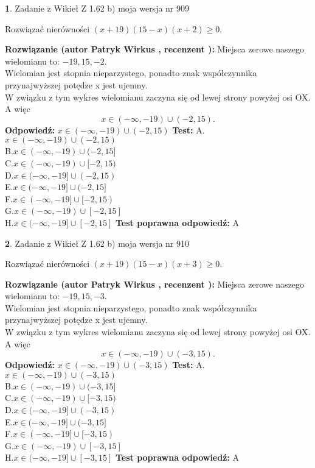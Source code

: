 \documentclass[12pt, a4paper]{article}
\theoremstyle{definition} %
\newtheorem{zad}{}
\newcommand{\zadStart}[1]{\begin{zad}#1\newline}
\newcommand{\zadStop}{\end{zad}}
\newcommand{\rozwStart}[2]{\noindent \textbf{Rozwiązanie (autor #1 , recenzent #2): }\newline}
\newcommand{\rozwStop}{\newline}
\newcommand{\odpStart}{\noindent \textbf{Odpowiedź:}\newline}
\newcommand{\odpStop}{\newline}
\newcommand{\testStart}{\noindent \textbf{Test:}\newline}
\newcommand{\testStop}{\newline}
\newcommand{\kluczStart}{\noindent \textbf{Test poprawna odpowiedź:}\newline}
\newcommand{\kluczStop}{\newline}
\begin{document}
\zadStart{Zadanie z Wikieł Z 1.62 b) moja wersja nr 909}

Rozwiązać nierówności $(x+19)(15-x)(x+2)\ge0$.
\zadStop
\rozwStart{Patryk Wirkus}{}
Miejsca zerowe naszego wielomianu to: $-19, 15, -2$.\\
Wielomian jest stopnia nieparzystego, ponadto znak współczynnika przy\linebreak najwyższej potędze x jest ujemny.\\ W związku z tym wykres wielomianu zaczyna się od lewej strony powyżej osi OX. A więc $$x \in (-\infty,-19) \cup (-2,15).$$
\rozwStop
\odpStart
$x \in (-\infty,-19) \cup (-2,15)$
\odpStop
\testStart
A.$x \in (-\infty,-19) \cup (-2,15)$\\
B.$x \in (-\infty,-19) \cup (-2,15]$\\
C.$x \in (-\infty,-19) \cup [-2,15)$\\
D.$x \in (-\infty,-19] \cup (-2,15)$\\
E.$x \in (-\infty,-19] \cup (-2,15]$\\
F.$x \in (-\infty,-19] \cup [-2,15)$\\
G.$x \in (-\infty,-19) \cup [-2,15]$\\
H.$x \in (-\infty,-19] \cup [-2,15]$
\testStop
\kluczStart
A
\kluczStop



\zadStart{Zadanie z Wikieł Z 1.62 b) moja wersja nr 910}

Rozwiązać nierówności $(x+19)(15-x)(x+3)\ge0$.
\zadStop
\rozwStart{Patryk Wirkus}{}
Miejsca zerowe naszego wielomianu to: $-19, 15, -3$.\\
Wielomian jest stopnia nieparzystego, ponadto znak współczynnika przy\linebreak najwyższej potędze x jest ujemny.\\ W związku z tym wykres wielomianu zaczyna się od lewej strony powyżej osi OX. A więc $$x \in (-\infty,-19) \cup (-3,15).$$
\rozwStop
\odpStart
$x \in (-\infty,-19) \cup (-3,15)$
\odpStop
\testStart
A.$x \in (-\infty,-19) \cup (-3,15)$\\
B.$x \in (-\infty,-19) \cup (-3,15]$\\
C.$x \in (-\infty,-19) \cup [-3,15)$\\
D.$x \in (-\infty,-19] \cup (-3,15)$\\
E.$x \in (-\infty,-19] \cup (-3,15]$\\
F.$x \in (-\infty,-19] \cup [-3,15)$\\
G.$x \in (-\infty,-19) \cup [-3,15]$\\
H.$x \in (-\infty,-19] \cup [-3,15]$
\testStop
\kluczStart
A
\kluczStop
\end{document}
